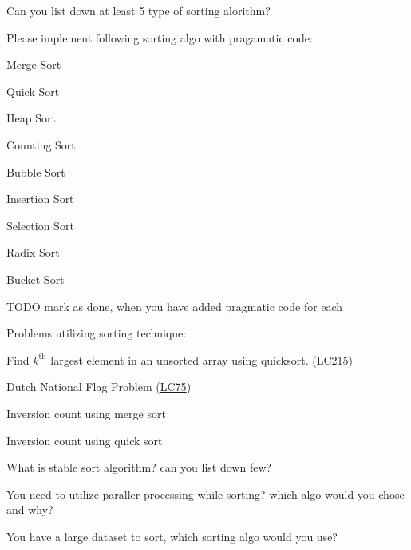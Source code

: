 {\smaller[1] 
\begin{exercise}


    \begin{compactenum}
        \item Can you list down at least 5 type of sorting alorithm?
        \item Please implement following sorting algo with pragamatic code:
        \begin{compactenum}
             \item Merge Sort 
             \item Quick Sort
             \item  Heap Sort
             \item Counting Sort

             \item Bubble Sort
             \item Insertion Sort
             \item Selection Sort
             
             \item Radix Sort
             \item Bucket Sort
             \item  TODO mark as done, when you have added pragmatic code for each
             
        \end{compactenum}

        \item Problems utilizing sorting technique:
            \begin{compactenum}
                \item Find $ k^{\text{th}} $ largest element in an unsorted array using quicksort. (LC215)
                \item Dutch National Flag Problem (\href{https://leetcode.com/problems/sort-colors/description/}{LC75})
                \item Inversion count using merge sort
                \item Inversion count using quick sort
            \end{compactenum}
        
        \item What is stable sort algorithm? can you list down few?
        \item You need to utilize paraller processing while sorting? which algo would you chose and why?
        \item You have a large dataset to sort, which sorting algo would you use?


\end{compactenum}
\end{exercise}}
